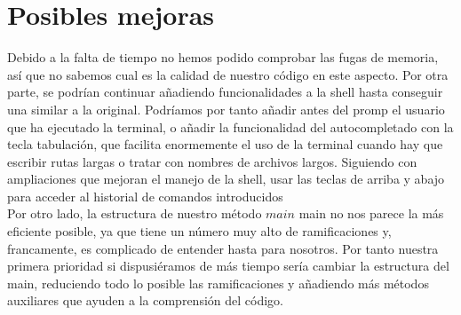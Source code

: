 \section{Posibles mejoras}
Debido a la falta de tiempo no hemos podido comprobar las fugas de memoria, así que no sabemos cual es la calidad de nuestro código en este aspecto. Por otra parte, se podrían continuar añadiendo funcionalidades a la shell hasta conseguir una similar a la original. Podríamos por tanto añadir antes del promp el usuario que ha ejecutado la terminal, o añadir la funcionalidad del autocompletado con la tecla tabulación, que facilita enormemente el uso de la terminal cuando hay que escribir rutas largas o tratar con nombres de archivos largos. Siguiendo con ampliaciones que mejoran el manejo de la shell, usar las teclas de arriba y abajo para acceder al historial de comandos introducidos\\
Por otro lado, la estructura de nuestro método $main$ main no nos parece la más eficiente posible, ya que tiene un número muy alto de ramificaciones y, francamente, es complicado de entender hasta para nosotros. Por tanto nuestra primera prioridad si dispusiéramos de más tiempo sería cambiar la estructura del main, reduciendo todo lo posible las ramificaciones y añadiendo más métodos auxiliares que ayuden a la comprensión del código. 
